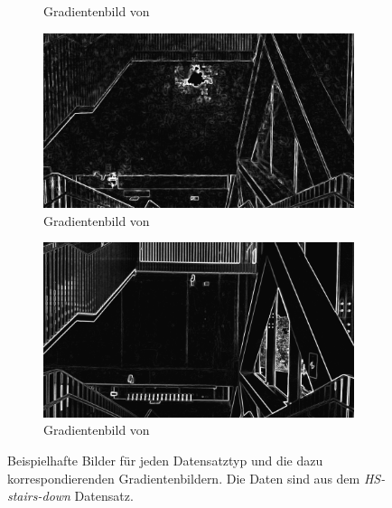 \begin{figure}
\begin{subfigure}[t]{0.24\linewidth}
		\caption{Gradientenbild  \hspace{1cm} von }
	\end{subfigure}
	\hfill
	\begin{subfigure}[t]{0.24\linewidth}
		\centering
		\includegraphics[width=\linewidth]{images/syn_dataset/cg00188.png}
		\caption{Gradientenbild  \hspace{1cm} von }
	\end{subfigure}
	\hfill
	\begin{subfigure}[t]{0.24\linewidth}
		\centering
		\includegraphics[width=\linewidth]{images/syn_dataset/rg000089.png}
		\caption{Gradientenbild  \hspace{1cm} von }
	\end{subfigure}
	\hfill
	\caption{Beispielhafte Bilder für jeden Datensatztyp und die dazu korrespondierenden Gradientenbildern. Die Daten sind aus dem \textit{HS-stairs-down} Datensatz.}
	\label{fig:dataset_preprocess}
\end{figure}

\cleardoublepage



